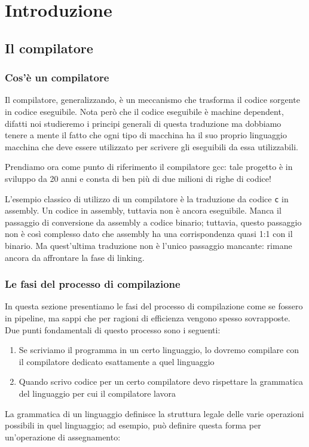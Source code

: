 \documentclass[class=book, crop=false, oneside, 12pt]{standalone}
\begin{document}
\chapter{Introduzione}

\section{Il compilatore}
\subsection{Cos'è un compilatore}
Il compilatore, generalizzando, è un meccanismo che trasforma il codice sorgente in codice eseguibile.
Nota però che il codice eseguibile è machine dependent, difatti noi studieremo i principi generali di questa traduzione ma dobbiamo tenere a mente il fatto che ogni tipo di macchina ha il suo proprio linguaggio macchina che deve essere utilizzato per scrivere gli eseguibili da essa utilizzabili.


Prendiamo ora come punto di riferimento il compilatore gcc: tale progetto è in sviluppo da 20 anni e consta di ben più di due milioni di righe di codice!


L’esempio classico di utilizzo di un compilatore è la traduzione da codice \texttt{c} in assembly.
Un codice in assembly, tuttavia non è ancora eseguibile. Manca il passaggio di conversione da assembly a codice binario; tuttavia, questo passaggio non è così complesso dato che assembly ha una corrispondenza quasi 1:1 con il binario.
Ma quest’ultima traduzione non è l’unico passaggio mancante: rimane ancora da affrontare la fase di linking.

\subsection{Le fasi del processo di compilazione}
In questa sezione presentiamo le fasi del processo di compilazione come se fossero in pipeline, ma sappi che per ragioni di efficienza vengono spesso sovrapposte. Due punti fondamentali di questo processo sono i seguenti:
\begin{enumerate}
    \item Se scriviamo il programma in un certo linguaggio, lo dovremo compilare con il compilatore dedicato esattamente a quel linguaggio
    \item Quando scrivo codice per un certo compilatore devo rispettare la grammatica del linguaggio per cui il compilatore lavora
\end{enumerate}
La grammatica di un linguaggio definisce la struttura legale delle varie operazioni possibili in quel linguaggio; ad esempio, può definire questa forma per un’operazione di assegnamento:
\end{document}
